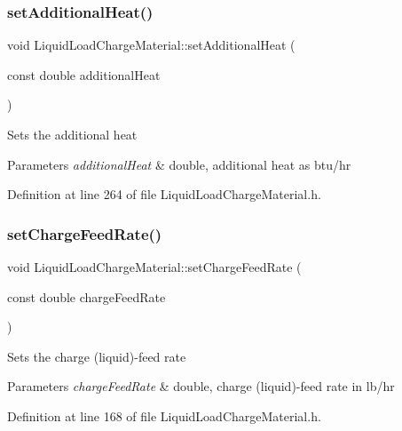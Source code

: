 \subsubsection{\texorpdfstring{set\+Additional\+Heat()}{setAdditionalHeat()}}
{\footnotesize\ttfamily void Liquid\+Load\+Charge\+Material\+::set\+Additional\+Heat (\begin{DoxyParamCaption}\item[{const double}]{additional\+Heat }\end{DoxyParamCaption})\hspace{0.3cm}{\ttfamily [inline]}}

Sets the additional heat 
\begin{DoxyParams}{Parameters}
{\em additional\+Heat} & double, additional heat as btu/hr \\
\hline
\end{DoxyParams}


Definition at line 264 of file Liquid\+Load\+Charge\+Material.\+h.

\mbox{\label{class_liquid_load_charge_material_a23d6aa6f15a124ddb1504261347b0b82}} 
\subsubsection{\texorpdfstring{set\+Charge\+Feed\+Rate()}{setChargeFeedRate()}}
{\footnotesize\ttfamily void Liquid\+Load\+Charge\+Material\+::set\+Charge\+Feed\+Rate (\begin{DoxyParamCaption}\item[{const double}]{charge\+Feed\+Rate }\end{DoxyParamCaption})\hspace{0.3cm}{\ttfamily [inline]}}

Sets the charge (liquid)-\/feed rate 
\begin{DoxyParams}{Parameters}
{\em charge\+Feed\+Rate} & double, charge (liquid)-\/feed rate in lb/hr \\
\hline
\end{DoxyParams}


Definition at line 168 of file Liquid\+Load\+Charge\+Material.\+h.

\mbox{\label{class_liquid_load_charge_material_a04ef0778e524f531b6dd2dd6137c270d}} 
